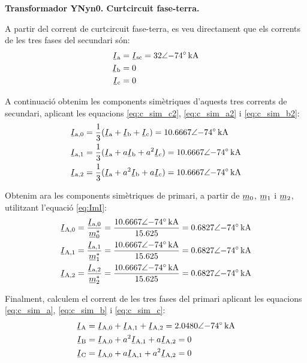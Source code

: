 \begin{exemple}[\CCasimSecTrafo{}]
    \textbf{ Transformador YNyn0. Curtcircuit fase-terra.}

    \begin{center}
       
    \end{center}

    A partir del corrent de curtcircuit fase-terra, es veu directament que els corrents de les tres fases del secundari són:
    \begin{align*}
        \cmplx{I}\ped{a} &= \cmplx{I}\ped{sc} = \complexqty{32:-74}{kA} \\
        \cmplx{I}\ped{b} &= 0  \\
        \cmplx{I}\ped{c} &= 0
    \end{align*}

    A continuació obtenim les components simètriques d'aquests tres corrents de secundari, aplicant les equacions \eqref{eq:c_sim_c2}, \eqref{eq:c_sim_a2} i \eqref{eq:c_sim_b2}:
    \begin{align*}
        \cmplx{I}\ped{a,0} &= \frac{1}{3} (\cmplx{I}\ped{a} + \cmplx{I}\ped{b} +
        \cmplx{I}\ped{c}) = \complexqty{10,6667:-74}{kA} \\
        \cmplx{I}\ped{a,1} &= \frac{1}{3} (\cmplx{I}\ped{a} + a \cmplx{I}\ped{b} +
         a^2 \cmplx{I}\ped{c}) = \complexqty{10,6667:-74}{kA}  \\
        \cmplx{I}\ped{a,2} &= \frac{1}{3} (\cmplx{I}\ped{a} + a^2 \cmplx{I}\ped{b} +
         a \cmplx{I}\ped{c}) = \complexqty{10,6667:-74}{kA}
    \end{align*}

    Obtenim ara les components simètriques de primari, a partir de $\cmplx{m}_0$, $\cmplx{m}_1$ i $\cmplx{m}_2$, utilitzant l'equació \eqref{eq:ImI}:
    \begin{align*}
        \cmplx{I}\ped{A,0} &= \frac{\cmplx{I}\ped{a,0}}{\cmplx{m}^*_0} = \frac{\complexqty{10,6667:-74}{kA}}{\num{15,625}} =  \complexqty{0,6827:-74}{kA}\\
        \cmplx{I}\ped{A,1} &= \frac{\cmplx{I}\ped{a,1}}{\cmplx{m}^*_1} = \frac{\complexqty{10,6667:-74}{kA}}{\num{15,625}} =  \complexqty{0,6827:-74}{kA} \\
        \cmplx{I}\ped{A,2} &= \frac{\cmplx{I}\ped{a,2}}{\cmplx{m}^*_2} = \frac{\complexqty{10,6667:-74}{kA}}{\num{15,625}} = \complexqty{0,6827:-74}{kA}
    \end{align*}

    Finalment, calculem el corrent de les tres fases del primari aplicant les equacions \eqref{eq:c_sim_a}, \eqref{eq:c_sim_b} i \eqref{eq:c_sim_c}:
     \begin{align*}
        \cmplx{I}\ped{A} &= \cmplx{I}\ped{A,0} + \cmplx{I}\ped{A,1} + \cmplx{I}\ped{A,2} = \complexqty{2,0480:-74}{kA} \\
        \cmplx{I}\ped{B} &= \cmplx{I}\ped{A,0} + a^2 \cmplx{I}\ped{A,1} + a \cmplx{I}\ped{A,2} = 0 \\
        \cmplx{I}\ped{C} &= \cmplx{I}\ped{A,0} + a \cmplx{I}\ped{A,1} + a^2 \cmplx{I}\ped{A,2} = 0
    \end{align*}


\end{exemple}
